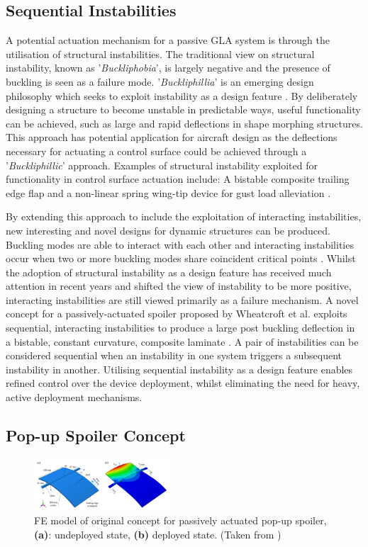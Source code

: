 \documentclass{IEEEtran}
\begin{document}
		\subsection{Sequential Instabilities}
		A potential actuation mechanism for a passive GLA system is through the utilisation of structural instabilities. The traditional view on structural instability, known as '\textit{Buckliphobia}', is largely negative and the presence of buckling is seen as a failure mode. '\textit{Buckliphillia}' is an emerging design philosophy which seeks to exploit instability as a design feature \cite{Reis_2015}. By deliberately designing a structure to become unstable in predictable ways, useful functionality can be achieved, such as large and rapid deflections in shape morphing structures. This approach has potential application for aircraft design as the deflections necessary for actuating a control surface could be achieved through a '\textit{Buckliphillic}' approach. Examples of structural instability exploited for functionality in control surface actuation include: A bistable composite trailing edge flap \cite{Daynes2010} and a non-linear spring wing-tip device for gust load alleviation \cite{Castrichini2017}.
		
         By extending this approach to include the exploitation of interacting instabilities, new interesting and novel designs for dynamic structures can be produced. Buckling modes are able to interact with each other and interacting instabilities occur when two or more buckling modes share coincident critical points \cite{Wheatcroft_2023}. Whilst the adoption of structural instability as a design feature has received much attention in recent years and shifted the view of instability to be more positive, interacting instabilities are still viewed primarily as a failure mechanism. A novel concept for a passively-actuated spoiler proposed by Wheatcroft et al. exploits sequential, interacting instabilities to produce a large post buckling deflection in a bistable, constant curvature, composite laminate \cite{Wheatcroft_2023}. A pair of instabilities can be considered sequential when an instability in one system triggers a subsequent instability in another. Utilising sequential instability as a design feature enables refined control over the device deployment, whilst eliminating the need for heavy, active deployment mechanisms.
		
		\subsection{Pop-up Spoiler Concept}
		\begin{figure}[!h]
			\centering
			\includegraphics[width=0.45\textwidth]{IntroductionImages/Concept.png}
			\caption{FE model of original concept for passively actuated pop-up spoiler, \textbf{(a)}: undeployed state, \textbf{(b)} deployed state. (Taken from \cite{Wheatcroft_2023})}
			\label{fig:OGConcept}
		\end{figure}
	
\end{document}
